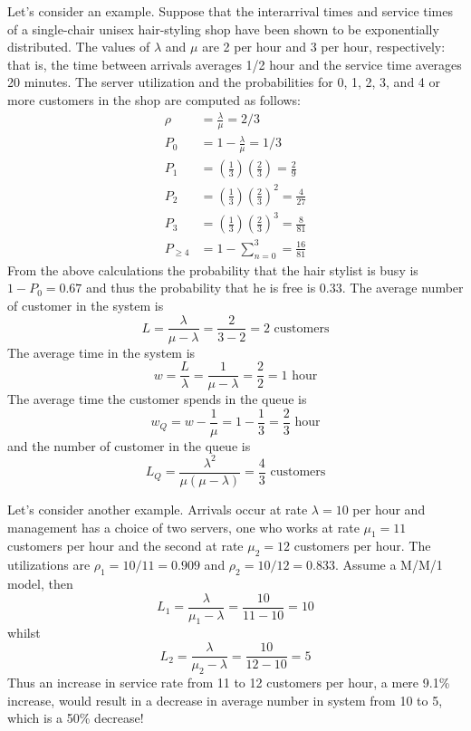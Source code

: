 \documentclass[
]{book}
\begin{document}
Let's consider an example. Suppose that the interarrival times and service times of a single-chair unisex hair-styling shop have been shown to be exponentially distributed. The values of \(\lambda\) and \(\mu\) are 2 per hour and 3 per hour, respectively: that is, the time between arrivals averages 1/2 hour and the service time averages 20 minutes. The server utilization and the probabilities for 0, 1, 2, 3, and 4 or more customers in the shop are computed as follows:
\begin{align*}
\rho &= \frac{\lambda}{\mu}=2/3\\
P_0 &= 1- \frac{\lambda}{\mu} = 1/3\\
P_1 &= \left(\frac{1}{3}\right) \left(\frac{2}{3}\right) =\frac{2}{9}\\
P_2 &= \left(\frac{1}{3}\right) \left(\frac{2}{3}\right)^2 =\frac{4}{27}\\
P_3 &= \left(\frac{1}{3}\right) \left(\frac{2}{3}\right)^3 =\frac{8}{81}\\
P_{\geq 4}&= 1-\sum_{n=0}^3=\frac{16}{81}
\end{align*}
From the above calculations the probability that the hair stylist is busy is \(1-P_0=0.67\) and thus the probability that he is free is \(0.33\). The average number of customer in the system is
\[
L=\frac{\lambda}{\mu-\lambda}=\frac{2}{3-2}= 2 \mbox{ customers}
\]
The average time in the system is
\[
w = \frac{L}{\lambda}=\frac{1}{\mu-\lambda} = \frac{2}{2}=1 \mbox{ hour}
\]
The average time the customer spends in the queue is
\[
w_Q = w - \frac{1}{\mu}= 1- \frac{1}{3}= \frac{2}{3} \mbox{ hour}
\]
and the number of customer in the queue is
\[
L_Q = \frac{\lambda^2}{\mu(\mu-\lambda)}=\frac{4}{3} \mbox{ customers}
\]

Let's consider another example. Arrivals occur at rate \(\lambda = 10\) per hour and management has a choice of two servers, one who works at rate \(\mu_1=11\) customers per hour and the second at rate \(\mu_2 = 12\) customers per hour. The utilizations are \(\rho_1 = 10/11=0.909\) and \(\rho_2 = 10/12 = 0.833\). Assume a M/M/1 model, then
\[
L_1 = \frac{\lambda}{\mu_1-\lambda}=\frac{10}{11-10}=10
\]
whilst
\[
L_2 = \frac{\lambda}{\mu_2-\lambda}=\frac{10}{12-10}=5
\]
Thus an increase in service rate from 11 to 12 customers per hour, a mere 9.1\% increase, would result in a decrease in average number in system from 10 to 5, which is a 50\% decrease!

  
\end{document}
